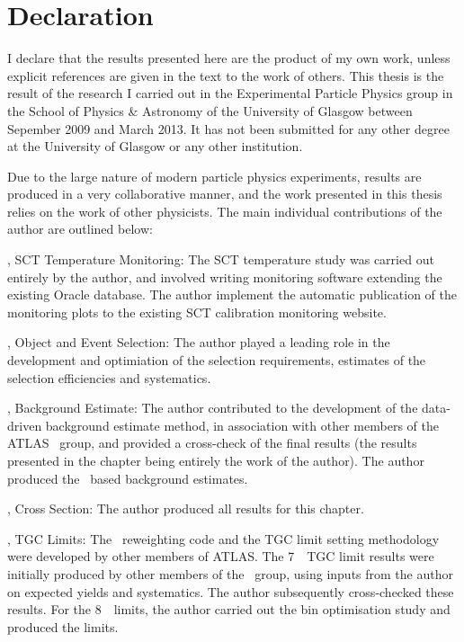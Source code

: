 \chapter*{Declaration}
I declare that the results presented here are the product of my own work, unless
explicit references are given in the text to the work of others. This thesis is
the result of the research I carried out in the Experimental Particle Physics
group in the School of Physics \& Astronomy of the University of Glasgow between
Sepember 2009 and March 2013. It has not been submitted for any other degree
at the University of Glasgow or any other institution.

Due to the large nature of modern particle physics experiments, results are produced in a very collaborative
manner, and the work presented in this thesis relies on the work of other
physicists. The main individual contributions of the author are outlined below:

, SCT Temperature Monitoring: The SCT temperature study was
carried out entirely by the author, and involved writing monitoring software
extending the existing Oracle database. The author implement the automatic
publication of the monitoring plots to the existing SCT calibration monitoring
website.

, Object and Event Selection: The author played a
leading role in the development and optimiation of the selection requirements,
estimates of the selection efficiencies and systematics.

, Background Estimate: The author contributed to the 
development of the data-driven background estimate method, in association with other members
of the ATLAS \ZZ\ group, and provided a cross-check of the final
results (the results presented in the chapter being entirely the work of the
author). The author produced the \mc\ based background estimates.

, Cross Section: The author produced all results for
this chapter.

, TGC Limits: The \AfterBurner\ reweighting code and the TGC
limit setting methodology were developed by other members of 
ATLAS. The 7~\tev\ TGC limit results were initially produced by
other members of the \ZZ\ group, using inputs from the author on expected
yields and systematics. The author subsequently cross-checked these results. For
the 8~\tev\ limits, the author carried out the bin optimisation study and
produced the limits.
